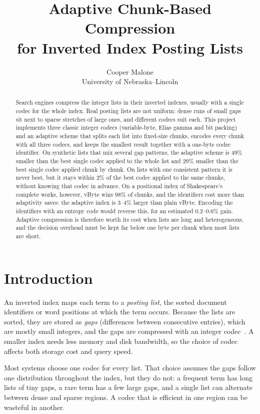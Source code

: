 \documentclass[11pt]{article}
\title{\textbf{Adaptive Chunk-Based Compression\\for Inverted Index Posting Lists}}
\author{Cooper Malone\\University of Nebraska--Lincoln}
\date{}
\begin{document}
\maketitle

\begin{abstract}
\noindent
Search engines compress the integer lists in their inverted indexes, usually with a single codec
for the whole index. Real posting lists are not uniform: dense runs of small gaps sit next to sparse
stretches of large ones, and different codecs suit each. This project implements three classic
integer codecs (variable-byte, Elias gamma and bit packing) and an adaptive scheme that splits each
list into fixed-size chunks, encodes every chunk with all three codecs, and keeps the smallest result
together with a one-byte codec identifier. On synthetic lists that mix several gap patterns, the
adaptive scheme is 49\% smaller than the best single codec applied to the whole list and 29\%
smaller than the best single codec applied chunk by chunk. On lists with one consistent pattern it
is never best, but it stays within 2\% of the best codec applied to the same chunks, without knowing
that codec in advance. On a positional
index of Shakespeare's complete works, however, vByte wins 98\% of chunks, and the identifiers cost
more than adaptivity saves: the adaptive index is 3--4\% larger than plain vByte. Encoding the
identifiers with an entropy code would reverse this, for an estimated 0.2--0.6\% gain. Adaptive
compression is therefore worth its cost when lists are long and heterogeneous, and the decision
overhead must be kept far below one byte per chunk when most lists are short.
\end{abstract}

\section{Introduction}

An inverted index maps each term to a \emph{posting list}, the sorted document identifiers or word
positions at which the term occurs. Because the lists are sorted, they are stored as \emph{gaps}
(differences between consecutive entries), which are mostly small integers, and the gaps are
compressed with an integer codec~\cite{manning2008}. A smaller index needs less memory and disk
bandwidth, so the choice of codec affects both storage cost and query speed.

Most systems choose one codec for every list. That choice assumes the gaps follow one distribution
throughout the index, but they do not: a frequent term has long lists of tiny gaps, a rare term has
a few large gaps, and a single list can alternate between dense and sparse regions. A codec that is
efficient in one region can be wasteful in another.
\end{document}
